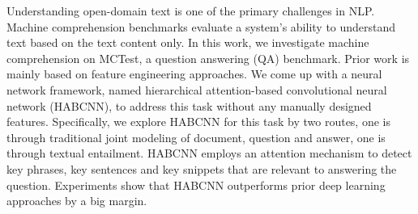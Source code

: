 Understanding open-domain text is one of the primary challenges in NLP. Machine comprehension benchmarks evaluate a system's ability to understand text based on the text content only. In this work, we investigate machine comprehension on MCTest, a question answering (QA) benchmark. Prior work is mainly based on feature engineering approaches. We come up with a neural network framework, named hierarchical attention-based convolutional neural network (HABCNN), to address this task without any manually designed features. Specifically, we explore HABCNN for this task by two routes, one is through traditional joint modeling of document, question and answer, one is through textual entailment. HABCNN employs an attention mechanism to detect key phrases, key sentences and key snippets that are relevant to answering the question. Experiments show that HABCNN outperforms prior deep learning approaches by a big margin.
